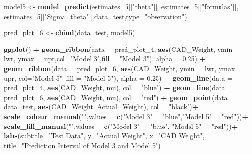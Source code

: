 \documentclass[]{article}
\newenvironment{Shaded}{\begin{snugshade}}{\end{snugshade}}
\newcommand{\KeywordTok}[1]{\textcolor[rgb]{0.13,0.29,0.53}{\textbf{#1}}}
\newcommand{\DataTypeTok}[1]{\textcolor[rgb]{0.13,0.29,0.53}{#1}}
\newcommand{\DecValTok}[1]{\textcolor[rgb]{0.00,0.00,0.81}{#1}}
\newcommand{\FloatTok}[1]{\textcolor[rgb]{0.00,0.00,0.81}{#1}}
\newcommand{\StringTok}[1]{\textcolor[rgb]{0.31,0.60,0.02}{#1}}
\newcommand{\OperatorTok}[1]{\textcolor[rgb]{0.81,0.36,0.00}{\textbf{#1}}}
\newcommand{\NormalTok}[1]{#1}
\begin{document}
\begin{Shaded}
\begin{Highlighting}[]
\NormalTok{model5 <-}\StringTok{ }\KeywordTok{model_predict}\NormalTok{(estimates_}\DecValTok{5}\NormalTok{[[}\StringTok{"theta"}\NormalTok{]], estimates_}\DecValTok{5}\NormalTok{[[}\StringTok{"formulas"}\NormalTok{]], estimates_}\DecValTok{5}\NormalTok{[[}\StringTok{"Sigma_theta"}\NormalTok{]],data_test,}\DataTypeTok{type=}\StringTok{"observation"}\NormalTok{)}


\NormalTok{pred_plot_}\DecValTok{6}\NormalTok{ <-}\StringTok{ }\KeywordTok{cbind}\NormalTok{(data_test, model5)}

\KeywordTok{ggplot}\NormalTok{() }\OperatorTok{+}
\StringTok{  }\KeywordTok{geom_ribbon}\NormalTok{(}\DataTypeTok{data =}\NormalTok{ pred_plot_}\DecValTok{4}\NormalTok{,}
              \KeywordTok{aes}\NormalTok{(CAD_Weight, }\DataTypeTok{ymin =}\NormalTok{ lwr, }\DataTypeTok{ymax =}\NormalTok{ upr,}\DataTypeTok{col=}\StringTok{"Model 3"}\NormalTok{,}\DataTypeTok{fill =} \StringTok{"Model 3"}\NormalTok{),}
              \DataTypeTok{alpha =} \FloatTok{0.25}\NormalTok{) }\OperatorTok{+}
\StringTok{  }\KeywordTok{geom_ribbon}\NormalTok{(}\DataTypeTok{data =}\NormalTok{ pred_plot_}\DecValTok{6}\NormalTok{,}
              \KeywordTok{aes}\NormalTok{(CAD_Weight, }\DataTypeTok{ymin =}\NormalTok{ lwr, }\DataTypeTok{ymax =}\NormalTok{ upr, }\DataTypeTok{col=}\StringTok{"Model 5"}\NormalTok{, }\DataTypeTok{fill =} \StringTok{"Model 5"}\NormalTok{),}
              \DataTypeTok{alpha =} \FloatTok{0.25}\NormalTok{) }\OperatorTok{+}
\StringTok{  }\KeywordTok{geom_line}\NormalTok{(}\DataTypeTok{data =}\NormalTok{ pred_plot_}\DecValTok{4}\NormalTok{, }\KeywordTok{aes}\NormalTok{(CAD_Weight, mu), }\DataTypeTok{col =} \StringTok{"blue"}\NormalTok{) }\OperatorTok{+}
\StringTok{  }\KeywordTok{geom_line}\NormalTok{(}\DataTypeTok{data =}\NormalTok{ pred_plot_}\DecValTok{6}\NormalTok{, }\KeywordTok{aes}\NormalTok{(CAD_Weight, mu), }\DataTypeTok{col =} \StringTok{"red"}\NormalTok{) }\OperatorTok{+}
\StringTok{  }\KeywordTok{geom_point}\NormalTok{(}\DataTypeTok{data =}\NormalTok{ data_test, }\KeywordTok{aes}\NormalTok{(CAD_Weight, Actual_Weight), }\DataTypeTok{col =} \StringTok{"black"}\NormalTok{)}\OperatorTok{+}
\StringTok{  }\KeywordTok{scale_colour_manual}\NormalTok{(}\StringTok{""}\NormalTok{,}\DataTypeTok{values =} \KeywordTok{c}\NormalTok{(}\StringTok{"Model 3"}\NormalTok{ =}\StringTok{ "blue"}\NormalTok{,}\StringTok{"Model 5"}\NormalTok{ =}\StringTok{ "red"}\NormalTok{))}\OperatorTok{+}
\StringTok{  }\KeywordTok{scale_fill_manual}\NormalTok{(}\StringTok{""}\NormalTok{,}\DataTypeTok{values =} \KeywordTok{c}\NormalTok{(}\StringTok{"Model 3"}\NormalTok{ =}\StringTok{ "blue"}\NormalTok{, }\StringTok{"Model 5"}\NormalTok{ =}\StringTok{ "red"}\NormalTok{))}\OperatorTok{+}
\StringTok{  }\KeywordTok{labs}\NormalTok{(}\DataTypeTok{subtitle=}\StringTok{"Test Data"}\NormalTok{, }
       \DataTypeTok{y=}\StringTok{"Actual Weight"}\NormalTok{, }
       \DataTypeTok{x=}\StringTok{"CAD Weight"}\NormalTok{, }
       \DataTypeTok{title=}\StringTok{"Prediction Interval of Model 3 and Model 5"}\NormalTok{)}
\end{Highlighting}
\end{Shaded}
\end{document}
